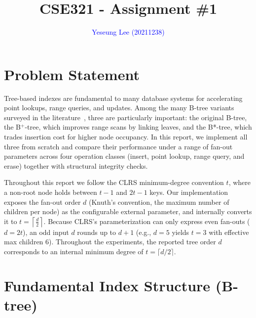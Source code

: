 \documentclass[sigconf]{acmart}
\begin{document}
\title{CSE321 - Assignment \#1}

\author{\textcolor{blue}{Yeseung Lee (20211238)}}

\renewcommand{\shortauthors}{\textcolor{blue}{Lee et al.}}



\renewcommand\footnotetextcopyrightpermission[1]{} %



\maketitle


\section{Problem Statement}
Tree-based indexes are fundamental to many database systems for accelerating point lookups, range queries, and updates. Among the many B-tree variants surveyed in the literature~\cite{comer1979}, three are particularly important: the original B-tree, the B$^+$-tree, which improves range scans by linking leaves, and the B*-tree, which trades insertion cost for higher node occupancy. In this report, we implement all three from scratch and compare their performance under a range of fan-out parameters across four operation classes (insert, point lookup, range query, and erase) together with structural integrity checks.

Throughout this report we follow the CLRS\cite{Cormen_Leiserson_Rivest_Stein_2022} minimum-degree convention $t$, where a non-root node holds between $t - 1$ and $2t - 1$ keys. 
Our implementation exposes the fan-out order $d$ (Knuth's convention, the maximum number of children per node) as the configurable external parameter, and internally converts it to $t=\left\lceil \frac{d}{2} \right\rceil$. 
Because CLRS's parameterization can only express even fan-outs ($d = 2t$), an odd input $d$ rounds up to $d + 1$ (e.g., $d=5$ yields $t = 3$ with effective max children 6). 
Throughout the experiments, the reported tree order $d$ corresponds to an internal minimum degree of $t = \lceil d/2 \rceil$.

\section{Fundamental Index Structure (B-tree)}
\end{document}
